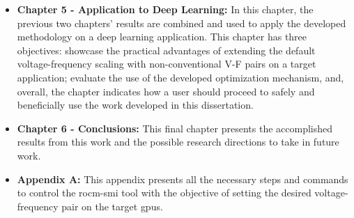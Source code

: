 \begin{itemize}
    \item \textbf{Chapter 5 - Application to Deep Learning:} In this chapter, the previous two chapters' results are combined and used to apply the developed methodology on a deep learning application. This chapter has three objectives: showcase the practical advantages of extending the default voltage-frequency scaling with non-conventional V-F pairs on a target application; evaluate the use of the developed optimization mechanism, and, overall, the chapter indicates how a user should proceed to safely and beneficially use the work developed in this dissertation.
    \item \textbf{Chapter 6 - Conclusions:} This final chapter presents the accomplished results from this work and the possible research directions to take in future work.
    \item \textbf{Appendix A:} This appendix presents all the necessary steps and commands to control the rocm-smi tool with the objective of setting the desired voltage-frequency pair on the target \acrshort{gpu}s.
\end{itemize}

